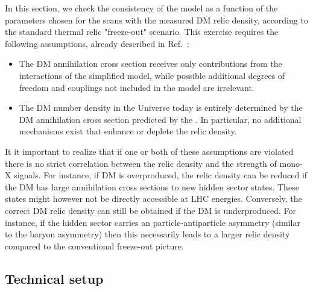 In this section, we check the consistency of the \hdma model as a function of the parameters chosen for the scans with the measured DM relic density, according to the standard thermal relic "freeze-out" scenario. This exercise requires the following assumptions, already described in Ref.~\cite{Albert:2017onk}: 

\begin{itemize}
\item The DM annihilation cross section receives only contributions from the interactions of the simplified model, while possible additional degrees of freedom and couplings not included in the model are irrelevant.
\item The DM number density in the Universe today is entirely determined by the DM annihilation cross section predicted by the \hdma. In particular, no additional mechanisms exist that enhance or deplete the relic density. 
\end{itemize}

It it important to realize that if one or both of these assumptions are violated there is no strict correlation between the relic density and the strength of mono-X signals. For instance, if DM is overproduced, the relic density can be reduced if the DM has large annihilation cross sections to new hidden sector states. These states might however not be directly accessible at LHC energies. Conversely, the correct DM relic density can still be obtained if the DM is underproduced. For instance, if the hidden sector carries an particle-antiparticle asymmetry (similar to the baryon asymmetry) then this necessarily leads to a larger relic density compared to the conventional freeze-out picture.

\subsection{Technical setup}

